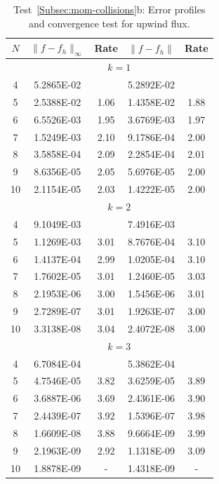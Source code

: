 \documentclass[preprint,11pt]{elsarticle}
\begin{document}
{\small
\begin{table}[H]
\caption{Test~\ref{Subsec:mom-collisions}b: Error profiles and convergence test for upwind flux.}\label{Tab:Mom-2}
\centering
\begin{tabular}{c|cc|cc}	\hline\hline
$N$ & $\|f-f_h\|_{\infty}$ & Rate & $\|f-f_h\|$ & Rate \\ \hline		
&\multicolumn{4}{c}{$k=1$}\\ \hline
4	&5.2865E-02	&		&5.2892E-02	&\\
5	&2.5388E-02	&1.06	&1.4358E-02	&1.88\\
6	&6.5526E-03	&1.95	&3.6769E-03	&1.97\\
7	&1.5249E-03	&2.10	&9.1786E-04	&2.00\\
8	&3.5858E-04	&2.09	&2.2854E-04	&2.01\\
9	&8.6356E-05	&2.05	&5.6976E-05	&2.00\\
10	&2.1154E-05	&2.03	&1.4222E-05	&2.00 \\ \hline		
&\multicolumn{4}{c}{$k=2$}\\ \hline
4	&9.1049E-03	&		&7.4916E-03	&\\
5	&1.1269E-03	&3.01	&8.7676E-04	&3.10\\
6	&1.4137E-04	&2.99	&1.0205E-04	&3.10\\
7	&1.7602E-05	&3.01	&1.2460E-05	&3.03\\
8	&2.1953E-06	&3.00	&1.5456E-06	&3.01\\
9	&2.7289E-07	&3.01	&1.9263E-07	&3.00\\
10	&3.3138E-08	&3.04	&2.4072E-08	&3.00 \\ \hline		
&\multicolumn{4}{c}{$k=3$}\\ \hline
4	&6.7084E-04	&		&5.3862E-04	&\\
5	&4.7546E-05	&3.82	&3.6259E-05	&3.89\\
6	&3.6887E-06	&3.69	&2.4361E-06	&3.90\\
7	&2.4439E-07	&3.92	&1.5396E-07	&3.98\\
8	&1.6609E-08	&3.88	&9.6664E-09	&3.99\\
9	&2.1963E-09	&2.92	&1.1318E-09	&3.09\\
10	&1.8878E-09	&-	&1.4318E-09	&- \\ \hline
\hline
\end{tabular}
\end{table}
}
\end{document}
